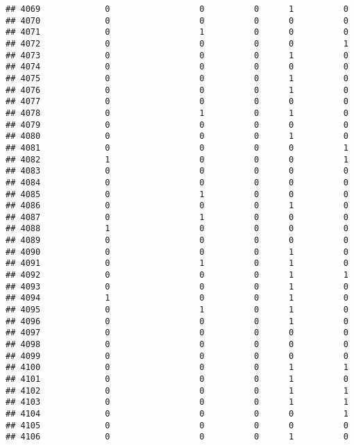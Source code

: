 \documentclass[
]{article}
\begin{document}
\begin{verbatim}
## 4069             0                  0          0      1          0
## 4070             0                  0          0      0          0
## 4071             0                  1          0      0          0
## 4072             0                  0          0      0          1
## 4073             0                  0          0      1          0
## 4074             0                  0          0      0          0
## 4075             0                  0          0      1          0
## 4076             0                  0          0      1          0
## 4077             0                  0          0      0          0
## 4078             0                  1          0      1          0
## 4079             0                  0          0      0          0
## 4080             0                  0          0      1          0
## 4081             0                  0          0      0          1
## 4082             1                  0          0      0          1
## 4083             0                  0          0      0          0
## 4084             0                  0          0      0          0
## 4085             0                  1          0      0          0
## 4086             0                  0          0      1          0
## 4087             0                  1          0      0          0
## 4088             1                  0          0      0          0
## 4089             0                  0          0      0          0
## 4090             0                  0          0      1          0
## 4091             0                  1          0      1          0
## 4092             0                  0          0      1          1
## 4093             0                  0          0      1          0
## 4094             1                  0          0      1          0
## 4095             0                  1          0      1          0
## 4096             0                  0          0      1          0
## 4097             0                  0          0      0          0
## 4098             0                  0          0      0          0
## 4099             0                  0          0      0          0
## 4100             0                  0          0      1          1
## 4101             0                  0          0      1          0
## 4102             0                  0          0      1          1
## 4103             0                  0          0      1          1
## 4104             0                  0          0      0          1
## 4105             0                  0          0      0          0
## 4106             0                  0          0      1          0

\end{verbatim}
\end{document}
